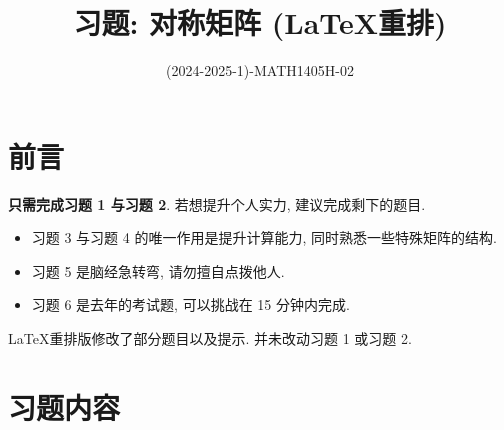 \documentclass[11pt]{ctexart}
\title{习题: 对称矩阵 (\LaTeX 重排)}
\author{(2024-2025-1)-MATH1405H-02}
\theoremstyle{definition}
\numberwithin{equation}{section}
\theoremstyle{definition}
\theoremstyle{remark}
\begin{document}
\maketitle

\vspace{5cm}

\section*{前言}

\textbf{只需完成习题 1 与习题 2}. 若想提升个人实力, 建议完成剩下的题目. 

\begin{itemize}
    \item 习题 3 与习题 4 的唯一作用是提升计算能力, 同时熟悉一些特殊矩阵的结构.
    \item 习题 5 是脑经急转弯, 请勿擅自点拨他人.
    \item 习题 6 是去年的考试题, 可以挑战在 15 分钟内完成.   
\end{itemize}

\begin{pinked}
\LaTeX 重排版修改了部分题目以及提示. 并未改动习题 1 或习题 2. 
\end{pinked}

\newpage

\section*{习题内容}
\end{document}
